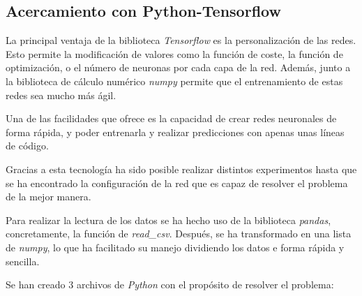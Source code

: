 \documentclass[12pt,a4paper, xcolor=table]{article}
\begin{document}
    \subsection{Acercamiento con Python-Tensorflow}

    La principal ventaja de la biblioteca \textit{Tensorflow} es la personalización de las redes. Esto permite la modificación de valores como la función de coste, la función de optimización, o el número de neuronas por cada capa de la red. Además, junto a la biblioteca de cálculo numérico \textit{numpy} permite que el entrenamiento de estas redes sea mucho más ágil.

    \vspace{3mm}

    Una de las facilidades que ofrece es la capacidad de crear redes neuronales de forma rápida, y poder entrenarla y realizar predicciones con apenas unas líneas de código.

    \vspace{2mm}

    Gracias a esta tecnología ha sido posible realizar distintos experimentos hasta que se ha encontrado la configuración de la red que es capaz de resolver el problema de la mejor manera.

    \vspace{3mm}

    Para realizar la lectura de los datos se ha hecho uso de la biblioteca \textit{pandas}, concretamente, la función de \textit{read\_csv}. Después, se ha transformado en una lista de \textit{numpy}, lo que ha facilitado su manejo dividiendo los datos e forma rápida y sencilla.

    \vspace{4mm}

    Se han creado 3 archivos de \textit{Python} con el propósito de resolver el problema:
\end{document}
